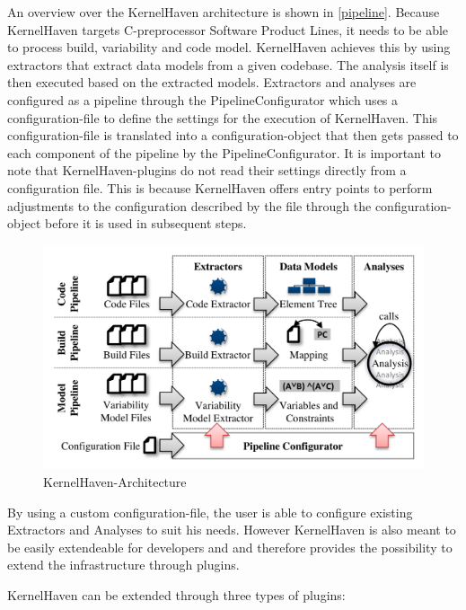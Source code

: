 \documentclass[a4paper]{article}
\begin{document}
An overview over the KernelHaven architecture is shown in \autoref{pipeline}. Because KernelHaven targets C-preprocessor Software Product Lines, it needs to be able to process build, variability and code model. KernelHaven achieves this by using extractors that extract data models from a given codebase. The analysis itself is then executed based on the extracted models. Extractors and analyses are configured as a pipeline through the PipelineConfigurator which uses a configuration-file to define the settings for the execution of KernelHaven. This configuration-file is translated into a configuration-object that then gets passed to each component of the pipeline by the PipelineConfigurator. It is  important to note that KernelHaven-plugins do not read their settings directly from a configuration file. This is because KernelHaven offers entry points to perform adjustments to the configuration described by the file through the configuration-object before it is used in subsequent steps.

\begin{figure}[h] 
  \centering
  \begin{minipage}[b]{1\textwidth} 
    \caption[KernelHaven-Pipeline]{KernelHaven-Architecture \cite{KroeherEl-SharkawySchmid18}}\label{pipeline}
    \includegraphics[width=1\textwidth]{img/KernelHaven-Pipeline.png}
  \end{minipage}
\end{figure}

By using a custom configuration-file, the user is able to configure existing Extractors and Analyses to suit his needs. However KernelHaven is also meant to be easily extendeable for developers and and therefore provides the possibility to extend the infrastructure through plugins.

KernelHaven can be extended through three types of plugins:
\end{document}
